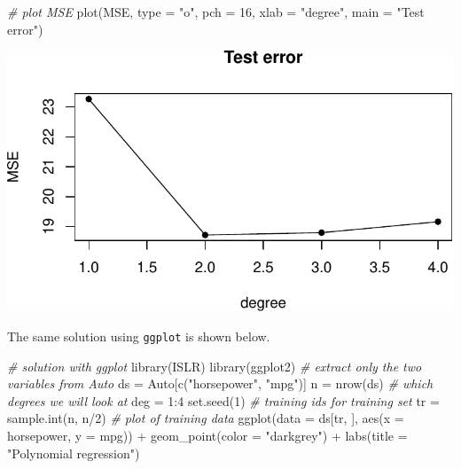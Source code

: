 \documentclass[
]{article}
\newenvironment{Shaded}{\begin{snugshade}}{\end{snugshade}}
\newcommand{\AttributeTok}[1]{\textcolor[rgb]{0.77,0.63,0.00}{#1}}
\newcommand{\CommentTok}[1]{\textcolor[rgb]{0.56,0.35,0.01}{\textit{#1}}}
\newcommand{\DecValTok}[1]{\textcolor[rgb]{0.00,0.00,0.81}{#1}}
\newcommand{\FunctionTok}[1]{\textcolor[rgb]{0.00,0.00,0.00}{#1}}
\newcommand{\NormalTok}[1]{#1}
\newcommand{\OtherTok}[1]{\textcolor[rgb]{0.56,0.35,0.01}{#1}}
\newcommand{\SpecialCharTok}[1]{\textcolor[rgb]{0.00,0.00,0.00}{#1}}
\newcommand{\StringTok}[1]{\textcolor[rgb]{0.31,0.60,0.02}{#1}}
\begin{document}
\begin{Shaded}
\begin{Highlighting}[]
\CommentTok{\# plot MSE}
\FunctionTok{plot}\NormalTok{(MSE, }\AttributeTok{type =} \StringTok{"o"}\NormalTok{, }\AttributeTok{pch =} \DecValTok{16}\NormalTok{, }\AttributeTok{xlab =} \StringTok{"degree"}\NormalTok{, }\AttributeTok{main =} \StringTok{"Test error"}\NormalTok{)}
\end{Highlighting}
\end{Shaded}

\includegraphics{RecEx7-sol_files/figure-latex/unnamed-chunk-1-2.pdf}

The same solution using \texttt{ggplot} is shown below.

\begin{Shaded}
\begin{Highlighting}[]
\CommentTok{\# solution with ggplot}
\FunctionTok{library}\NormalTok{(ISLR)}
\FunctionTok{library}\NormalTok{(ggplot2)}
\CommentTok{\# extract only the two variables from Auto}
\NormalTok{ds }\OtherTok{=}\NormalTok{ Auto[}\FunctionTok{c}\NormalTok{(}\StringTok{"horsepower"}\NormalTok{, }\StringTok{"mpg"}\NormalTok{)]}
\NormalTok{n }\OtherTok{=} \FunctionTok{nrow}\NormalTok{(ds)}
\CommentTok{\# which degrees we will look at}
\NormalTok{deg }\OtherTok{=} \DecValTok{1}\SpecialCharTok{:}\DecValTok{4}
\FunctionTok{set.seed}\NormalTok{(}\DecValTok{1}\NormalTok{)}
\CommentTok{\# training ids for training set}
\NormalTok{tr }\OtherTok{=} \FunctionTok{sample.int}\NormalTok{(n, n}\SpecialCharTok{/}\DecValTok{2}\NormalTok{)}
\CommentTok{\# plot of training data}
\FunctionTok{ggplot}\NormalTok{(}\AttributeTok{data =}\NormalTok{ ds[tr, ], }\FunctionTok{aes}\NormalTok{(}\AttributeTok{x =}\NormalTok{ horsepower, }\AttributeTok{y =}\NormalTok{ mpg)) }\SpecialCharTok{+} \FunctionTok{geom\_point}\NormalTok{(}\AttributeTok{color =} \StringTok{"darkgrey"}\NormalTok{) }\SpecialCharTok{+} \FunctionTok{labs}\NormalTok{(}\AttributeTok{title =} \StringTok{"Polynomial regression"}\NormalTok{)}
\end{Highlighting}
\end{Shaded}
\end{document}

